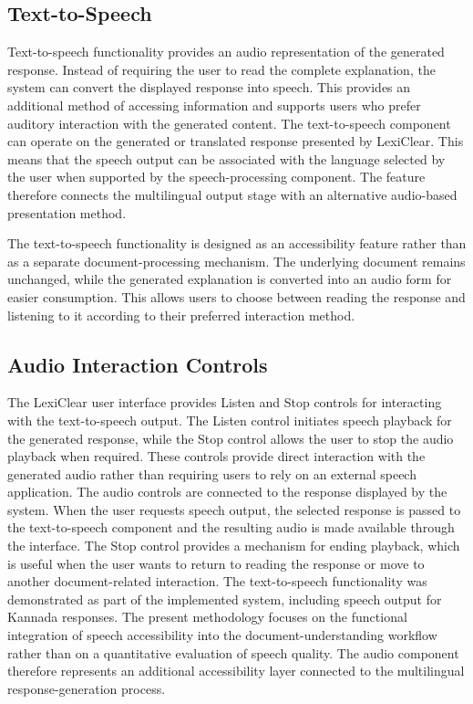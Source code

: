 \documentclass[12pt,a4paper,oneside]{report}
\begin{document}
\subsection{Text-to-Speech}

Text-to-speech functionality provides an audio representation of the generated response. Instead of requiring the user to read the complete explanation, the system can convert the displayed response into speech. This provides an additional method of accessing information and supports users who prefer auditory interaction with the generated content. The text-to-speech component can operate on the generated or translated response presented by LexiClear. This means that the speech output can be associated with the language selected by the user when supported by the speech-processing component. The feature therefore connects the multilingual output stage with an alternative audio-based presentation method.

The text-to-speech functionality is designed as an accessibility feature rather than as a separate document-processing mechanism. The underlying document remains unchanged, while the generated explanation is converted into an audio form for easier consumption. This allows users to choose between reading the response and listening to it according to their preferred interaction method.

\subsection{Audio Interaction Controls}

The LexiClear user interface provides Listen and Stop controls for interacting with the text-to-speech output. The Listen control initiates speech playback for the generated response, while the Stop control allows the user to stop the audio playback when required. These controls provide direct interaction with the generated audio rather than requiring users to rely on an external speech application. The audio controls are connected to the response displayed by the system. When the user requests speech output, the selected response is passed to the text-to-speech component and the resulting audio is made available through the interface. The Stop control provides a mechanism for ending playback, which is useful when the user wants to return to reading the response or move to another document-related interaction. The text-to-speech functionality was demonstrated as part of the implemented system, including speech output for Kannada responses. The present methodology focuses on the functional integration of speech accessibility into the document-understanding workflow rather than on a quantitative evaluation of speech quality. The audio component therefore represents an additional accessibility layer connected to the multilingual response-generation process.
\end{document}
